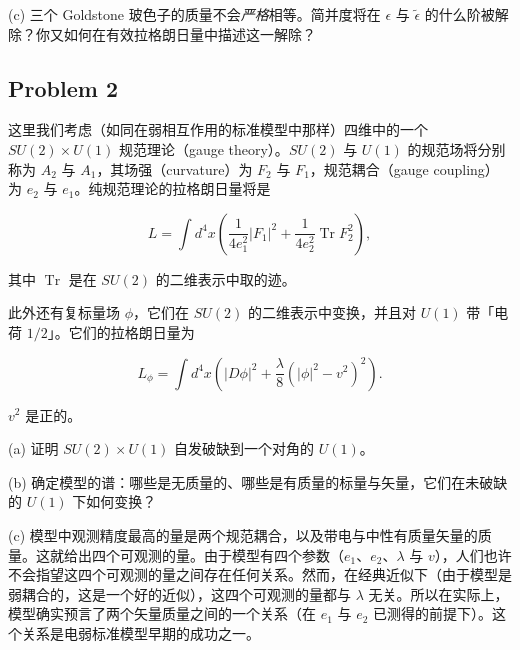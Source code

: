 
(c) 三个 Goldstone 玻色子的质量不会\emph{严格}相等。简并度将在 $\epsilon$ 与 $\widetilde{\epsilon}$ 的什么阶被解除？你又如何在有效拉格朗日量中描述这一解除？

\subsection*{Problem 2}

这里我们考虑（如同在弱相互作用的标准模型中那样）四维中的一个 $SU(2)\times U(1)$ 规范理论（gauge theory）。$SU(2)$ 与 $U(1)$ 的规范场将分别称为 $A_2$ 与 $A_1$，其场强（curvature）为 $F_2$ 与 $F_1$，规范耦合（gauge coupling）为 $e_2$ 与 $e_1$。纯规范理论的拉格朗日量将是

\begin{equation}
  \tag{2}
  \label{eq:ex-2}
  L=\int d^4x\left(\frac{1}{4e_1^2}|F_1|^2+\frac{1}{4e_2^2}\operatorname{Tr}F_2^2\right),
\end{equation}

其中 $\operatorname{Tr}$ 是在 $SU(2)$ 的二维表示中取的迹。


此外还有复标量场 $\phi$，它们在 $SU(2)$ 的二维表示中变换，并且对 $U(1)$ 带「电荷 $1/2$」。它们的拉格朗日量为

\begin{equation}
  \tag{3}
  \label{eq:ex-3}
  L_\phi=\int d^4x\left(|D\phi|^2+\frac{\lambda}{8}\left(|\phi|^2-v^2\right)^2\right).
\end{equation}

$v^2$ 是正的。

(a) 证明 $SU(2)\times U(1)$ 自发破缺到一个对角的 $U(1)$。

(b) 确定模型的谱：哪些是无质量的、哪些是有质量的标量与矢量，它们在未破缺的 $U(1)$ 下如何变换？

(c) 模型中观测精度最高的量是两个规范耦合，以及带电与中性有质量矢量的质量。这就给出四个可观测的量。由于模型有四个参数（$e_1$、$e_2$、$\lambda$ 与 $v$），人们也许不会指望这四个可观测的量之间存在任何关系。然而，在经典近似下（由于模型是弱耦合的，这是一个好的近似），这四个可观测的量都与 $\lambda$ 无关。所以在实际上，模型确实预言了两个矢量质量之间的一个关系（在 $e_1$ 与 $e_2$ 已测得的前提下）。这个关系是电弱标准模型早期的成功之一。

